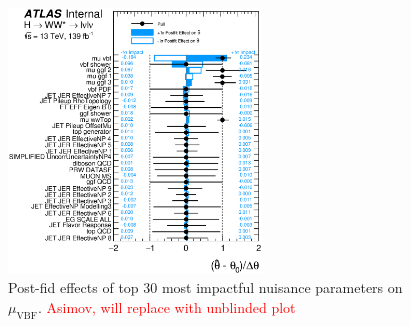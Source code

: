 \begin{figure}[!h]
\centering
      \includegraphics[width=0.6\textwidth]{Pictures/fitresults/impact_asimov_mu_vbf.eps}
{\caption{Post-fid effects of top 30 most impactful nuisance parameters on $\mu_{\text{VBF}}$. \textcolor{red}{Asimov, will replace with unblinded plot}
\label{fig:impacts}}}
\end{figure}


